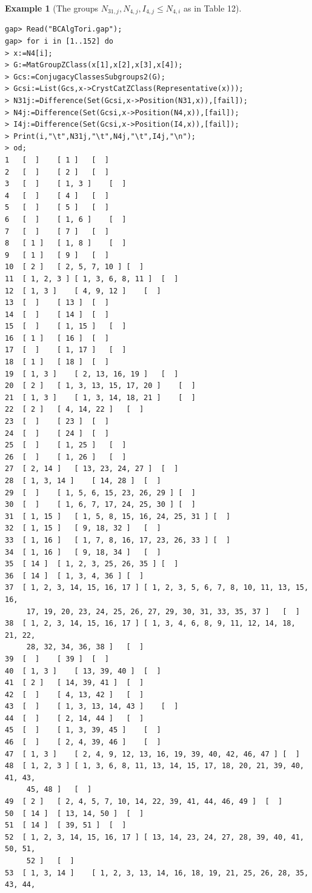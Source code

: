 \documentclass{amsart}
\theoremstyle{plain}
\theoremstyle{definition}
\newtheorem{example}[theorem]{Example}
\theoremstyle{remark}
\begin{document}
\bigskip
\begin{example}[The groups $N_{31,j}, N_{4,j}, I_{4,j}\leq N_{4,i}$ as in Table 12]~\vspace*{-5mm}\\
\begin{verbatim}
gap> Read("BCAlgTori.gap");
gap> for i in [1..152] do
> x:=N4[i];
> G:=MatGroupZClass(x[1],x[2],x[3],x[4]);
> Gcs:=ConjugacyClassesSubgroups2(G);
> Gcsi:=List(Gcs,x->CrystCatZClass(Representative(x)));
> N31j:=Difference(Set(Gcsi,x->Position(N31,x)),[fail]);
> N4j:=Difference(Set(Gcsi,x->Position(N4,x)),[fail]);
> I4j:=Difference(Set(Gcsi,x->Position(I4,x)),[fail]);
> Print(i,"\t",N31j,"\t",N4j,"\t",I4j,"\n");
> od;
1	[  ]	[ 1 ]	[  ]
2	[  ]	[ 2 ]	[  ]
3	[  ]	[ 1, 3 ]	[  ]
4	[  ]	[ 4 ]	[  ]
5	[  ]	[ 5 ]	[  ]
6	[  ]	[ 1, 6 ]	[  ]
7	[  ]	[ 7 ]	[  ]
8	[ 1 ]	[ 1, 8 ]	[  ]
9	[ 1 ]	[ 9 ]	[  ]
10	[ 2 ]	[ 2, 5, 7, 10 ]	[  ]
11	[ 1, 2, 3 ]	[ 1, 3, 6, 8, 11 ]	[  ]
12	[ 1, 3 ]	[ 4, 9, 12 ]	[  ]
13	[  ]	[ 13 ]	[  ]
14	[  ]	[ 14 ]	[  ]
15	[  ]	[ 1, 15 ]	[  ]
16	[ 1 ]	[ 16 ]	[  ]
17	[  ]	[ 1, 17 ]	[  ]
18	[ 1 ]	[ 18 ]	[  ]
19	[ 1, 3 ]	[ 2, 13, 16, 19 ]	[  ]
20	[ 2 ]	[ 1, 3, 13, 15, 17, 20 ]	[  ]
21	[ 1, 3 ]	[ 1, 3, 14, 18, 21 ]	[  ]
22	[ 2 ]	[ 4, 14, 22 ]	[  ]
23	[  ]	[ 23 ]	[  ]
24	[  ]	[ 24 ]	[  ]
25	[  ]	[ 1, 25 ]	[  ]
26	[  ]	[ 1, 26 ]	[  ]
27	[ 2, 14 ]	[ 13, 23, 24, 27 ]	[  ]
28	[ 1, 3, 14 ]	[ 14, 28 ]	[  ]
29	[  ]	[ 1, 5, 6, 15, 23, 26, 29 ]	[  ]
30	[  ]	[ 1, 6, 7, 17, 24, 25, 30 ]	[  ]
31	[ 1, 15 ]	[ 1, 5, 8, 15, 16, 24, 25, 31 ]	[  ]
32	[ 1, 15 ]	[ 9, 18, 32 ]	[  ]
33	[ 1, 16 ]	[ 1, 7, 8, 16, 17, 23, 26, 33 ]	[  ]
34	[ 1, 16 ]	[ 9, 18, 34 ]	[  ]
35	[ 14 ]	[ 1, 2, 3, 25, 26, 35 ]	[  ]
36	[ 14 ]	[ 1, 3, 4, 36 ]	[  ]
37	[ 1, 2, 3, 14, 15, 16, 17 ]	[ 1, 2, 3, 5, 6, 7, 8, 10, 11, 13, 15, 16, 
     17, 19, 20, 23, 24, 25, 26, 27, 29, 30, 31, 33, 35, 37 ]	[  ]
38	[ 1, 2, 3, 14, 15, 16, 17 ]	[ 1, 3, 4, 6, 8, 9, 11, 12, 14, 18, 21, 22, 
     28, 32, 34, 36, 38 ]	[  ]
39	[  ]	[ 39 ]	[  ]
40	[ 1, 3 ]	[ 13, 39, 40 ]	[  ]
41	[ 2 ]	[ 14, 39, 41 ]	[  ]
42	[  ]	[ 4, 13, 42 ]	[  ]
43	[  ]	[ 1, 3, 13, 14, 43 ]	[  ]
44	[  ]	[ 2, 14, 44 ]	[  ]
45	[  ]	[ 1, 3, 39, 45 ]	[  ]
46	[  ]	[ 2, 4, 39, 46 ]	[  ]
47	[ 1, 3 ]	[ 2, 4, 9, 12, 13, 16, 19, 39, 40, 42, 46, 47 ]	[  ]
48	[ 1, 2, 3 ]	[ 1, 3, 6, 8, 11, 13, 14, 15, 17, 18, 20, 21, 39, 40, 41, 43, 
     45, 48 ]	[  ]
49	[ 2 ]	[ 2, 4, 5, 7, 10, 14, 22, 39, 41, 44, 46, 49 ]	[  ]
50	[ 14 ]	[ 13, 14, 50 ]	[  ]
51	[ 14 ]	[ 39, 51 ]	[  ]
52	[ 1, 2, 3, 14, 15, 16, 17 ]	[ 13, 14, 23, 24, 27, 28, 39, 40, 41, 50, 51, 
     52 ]	[  ]
53	[ 1, 3, 14 ]	[ 1, 2, 3, 13, 14, 16, 18, 19, 21, 25, 26, 28, 35, 43, 44, 

\end{verbatim}
\end{example}
\end{document}

